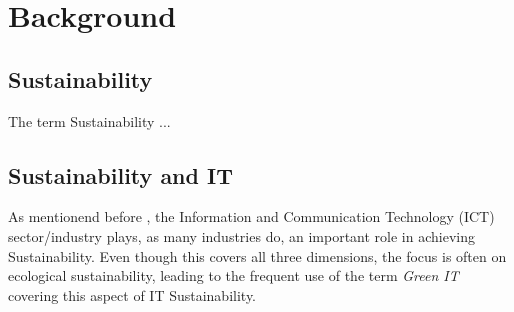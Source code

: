 \chapter{Background} %
\section{Sustainability}
The term Sustainability ... %



\section{Sustainability and IT}  %
As mentionend before %
, the Information and Communication Technology (ICT) %
sector/industry plays, as many industries do, an important role in achieving Sustainability. Even though this covers all three dimensions, the focus is often on ecological sustainability, leading to the frequent use of the term \textit{Green IT} covering this aspect of IT Sustainability. %




